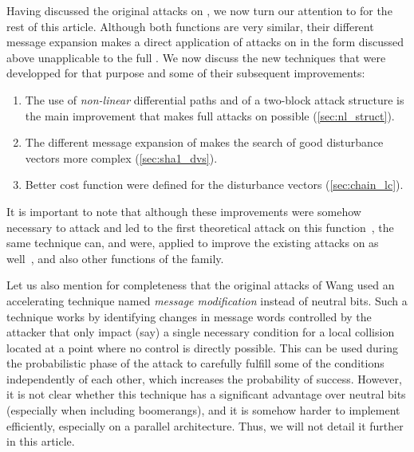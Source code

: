 Having discussed the original attacks on \shazero, we now turn our attention to \shaone for the rest of this article. Although both functions are very similar, their different message expansion makes a direct
application of attacks on \shazero in the form discussed above unapplicable to the full \shaone. We now discuss the new techniques that were developped for that purpose and some of their
subsequent improvements:
\begin{enumerate}
\item The use of \emph{non-linear} differential paths and of a two-block attack structure is the main improvement that makes full attacks on \shaone possible (\autoref{sec:nl_struct}).
\item The different message expansion of \shaone makes the search of good disturbance vectors more complex (\autoref{sec:sha1_dvs}).
\item Better cost function were defined for the disturbance vectors (\autoref{sec:chain_lc}). 
\end{enumerate}
It is important to note that although these improvements were somehow necessary to attack \shaone and led to the first theoretical attack on this function~\cite{DBLP:conf/crypto/WangYY05a},
the same technique can, and were, applied to improve the existing attacks on \shazero as well~\cite{DBLP:conf/crypto/WangYY05}, and also other functions of the \mdsha family.

Let us also mention for completeness that the original attacks of Wang \etal used an accelerating technique named \emph{message modification} instead of neutral bits. Such a technique works
by identifying changes in message words controlled by the attacker that only impact (say) a single necessary condition for a local collision located at a point where no control is directly possible.
This can be used during the probabilistic phase of the attack to carefully fulfill some of the conditions independently of each other, which increases the probability of success. However, it is not
clear whether this technique has a significant advantage over neutral bits (especially when including boomerangs), and it is somehow harder to implement efficiently, especially on a parallel architecture. Thus, we will not detail it
further in this article. 

